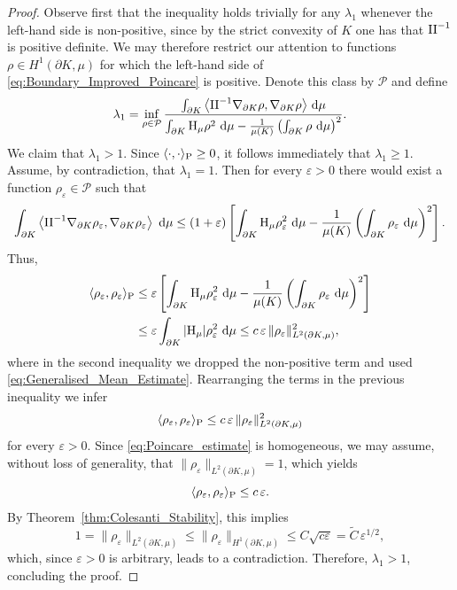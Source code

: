 \documentclass[a4paper, 11pt]{article}
\theoremstyle{definition}
\newcommand{\di}{\, \mathrm{d}}
\begin{document}
\begin{proof}
Observe first that the inequality holds trivially for any $\lambda_1$ whenever the left-hand side is non-positive, since by the strict convexity of $K$ one has that ${\rm II}^{-1}$ is positive definite. We may therefore restrict our attention to functions $\rho\in H^{1}(\partial K,\mu)$ for which the left-hand side of \eqref{eq:Boundary_Improved_Poincare} is positive. Denote this class by $\mathcal{P}$ and define
\[\lambda_{1}= \inf_{\rho \in \mathcal{P}} \frac{\int_{\partial K} \left\langle {\rm II}^{-1}\nabla_{\partial K}\rho, \nabla_{\partial K} \rho \right\rangle \di\mu}{\int_{\partial K}{\rm H}_\mu\rho^2\,\di\mu-\frac{1}{\mu(K)}\left( \int_{\partial K}\rho\,\di\mu \right)^2 }.\]
We claim that $\lambda_{1}>1$. Since $\langle \cdot,\cdot\rangle_{\rm P}\geq 0$, it follows immediately that $\lambda_{1}\geq 1$. Assume, by contradiction, that $\lambda_{1}=1$. Then for every $\varepsilon>0$ there would exist a function $\rho_{\varepsilon}\in\mathcal{P}$ such that
\[ \int_{\partial K} \left\langle {\rm II}^{-1}\nabla_{\partial K}\rho_{\varepsilon}, \nabla_{\partial K} \rho_{\varepsilon}\right\rangle \,\di\mu\leq (1+\varepsilon)\left[\int_{\partial K}{\rm H}_\mu\rho_{\varepsilon}^2\,\di\mu-\frac{1}{\mu(K)}\left( \int_{\partial K}\rho_{\varepsilon}\,\di\mu \right)^2\right]. \]
Thus,
\begin{align*}
    \notag \langle \rho_{\varepsilon},\rho_{\varepsilon} \rangle_{\rm P}
    &\leq \varepsilon\left[\int_{\partial K}{\rm H}_\mu\rho_{\varepsilon}^2\,\di\mu-\frac{1}{\mu(K)}\left( \int_{\partial K}\rho_{\varepsilon}\,\di\mu \right)^2
    \right] \\
    &\leq \varepsilon \int_{\partial K}|{\rm H}_\mu|\rho_{\varepsilon}^2\,\di\mu \leq c\,\varepsilon\,\|\rho_{\varepsilon}\|^2_{L^{2}(\partial K,\mu)},
\end{align*}
where in the second inequality we dropped the non-positive term and used \eqref{eq:Generalised_Mean_Estimate}. Rearranging the terms in the previous inequality we infer
\begin{equation}\label{eq:Poincare_estimate}
     \langle \rho_{\varepsilon},\rho_{\varepsilon} \rangle_{\rm P} \leq c\,\varepsilon\,\|\rho_{\varepsilon}\|^2_{L^{2}(\partial K,\mu)}
\end{equation}
for every $\varepsilon >0$. Since \eqref{eq:Poincare_estimate} is homogeneous, we may assume, without loss of generality, that $\|\rho_{\varepsilon}\|_{L^{2}(\partial K,\mu)}=1$, which yields
\[\langle \rho_{\varepsilon},\rho_{\varepsilon} \rangle_{\rm P} \leq c\,\varepsilon.\]
By Theorem~\ref{thm:Colesanti_Stability}, this implies
\[1=\|\rho_{\varepsilon}\|_{L^{2}(\partial K,\mu)}\leq \|\rho_{\varepsilon}\|_{H^{1}(\partial K,\mu)}\leq C\sqrt{c\varepsilon}= \tilde C\,\varepsilon^{1/2},\]
which, since $\varepsilon>0$ is arbitrary, leads to a contradiction. Therefore, $\lambda_{1}>1$, concluding the proof.
\end{proof}\noindent
\end{document}
